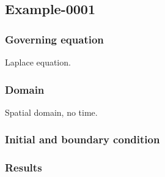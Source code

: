 %
\subsection{Example-0001}
%
%
\subsubsection{Governing equation}
%
Laplace equation.
%
%
\subsubsection{Domain}
%
Spatial domain, no time.
%
%
\subsubsection{Initial and boundary condition}
%
%
\subsubsection{Results}
%

